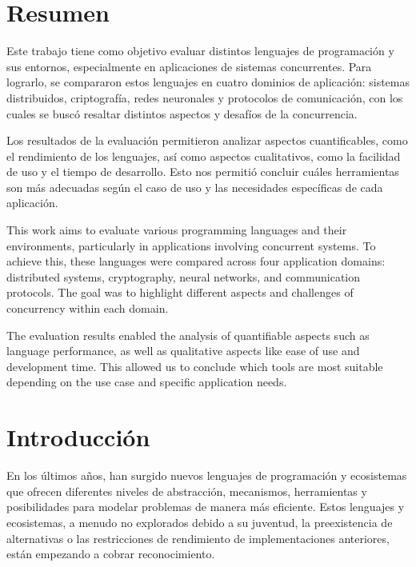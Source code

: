 \documentclass[11pt]{article}
\let\Oldsection\section
\renewcommand{\section}{\FloatBarrier\Oldsection}
\begin{document}


\tableofcontents
\newpage

\section{Resumen}


Este trabajo tiene como objetivo evaluar distintos lenguajes de programación y sus entornos, especialmente en aplicaciones de sistemas concurrentes. Para lograrlo, se compararon estos lenguajes en cuatro dominios de aplicación: sistemas distribuidos, criptografía, redes neuronales y protocolos de comunicación, con los cuales se buscó resaltar distintos aspectos y desafíos de la concurrencia.

Los resultados de la evaluación permitieron analizar aspectos cuantificables, como el rendimiento de los lenguajes, así como aspectos cualitativos, como la facilidad de uso y el tiempo de desarrollo. Esto nos permitió concluir cuáles herramientas son más adecuadas según el caso de uso y las necesidades específicas de cada aplicación.

This work aims to evaluate various programming languages and their environments, particularly in applications involving concurrent systems. To achieve this, these languages were compared across four application domains: distributed systems, cryptography, neural networks, and communication protocols. The goal was to highlight different aspects and challenges of concurrency within each domain.

The evaluation results enabled the analysis of quantifiable aspects such as language performance, as well as qualitative aspects like ease of use and development time. This allowed us to conclude which tools are most suitable depending on the use case and specific application needs.

\newpage

\section{Introducción}

En los últimos años, han surgido nuevos lenguajes de programación y ecosistemas que ofrecen diferentes niveles de abstracción, mecanismos, herramientas y posibilidades para modelar problemas de manera más eficiente. Estos lenguajes y ecosistemas, a menudo no explorados debido a su juventud, la preexistencia de alternativas o las restricciones de rendimiento de implementaciones anteriores, están empezando a cobrar reconocimiento.
\end{document}
